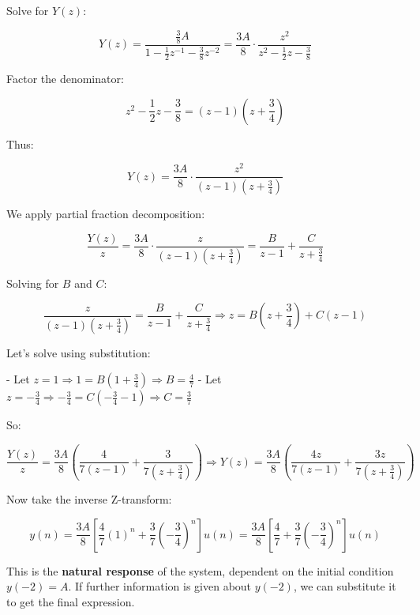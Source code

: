 \documentclass[12pt]{article}
\begin{document}
    Solve for \( Y(z) \):
    
    \[
    Y(z) = \frac{\frac{3}{8}A}{1 - \frac{1}{2}z^{-1} - \frac{3}{8}z^{-2}} = \frac{3A}{8} \cdot \frac{z^2}{z^2 - \frac{1}{2}z - \frac{3}{8}}
    \]
    
    Factor the denominator:
    
    \[
    z^2 - \frac{1}{2}z - \frac{3}{8} = \left(z - 1\right)\left(z + \frac{3}{4}\right)
    \]
    
    Thus:
    
    \[
    Y(z) = \frac{3A}{8} \cdot \frac{z^2}{(z - 1)(z + \frac{3}{4})}
    \]
    
    We apply partial fraction decomposition:
    
    \[
    \frac{Y(z)}{z} = \frac{3A}{8} \cdot \frac{z}{(z - 1)(z + \frac{3}{4})} = \frac{B}{z - 1} + \frac{C}{z + \frac{3}{4}}
    \]
    
    Solving for \( B \) and \( C \):
    
    \[
    \frac{z}{(z - 1)(z + \frac{3}{4})} = \frac{B}{z - 1} + \frac{C}{z + \frac{3}{4}}
    \Rightarrow z = B\left(z + \frac{3}{4}\right) + C\left(z - 1\right)
    \]
    
    Let’s solve using substitution:
    
    - Let \( z = 1 \Rightarrow 1 = B\left(1 + \frac{3}{4}\right) \Rightarrow B = \frac{4}{7} \)
    - Let \( z = -\frac{3}{4} \Rightarrow -\frac{3}{4} = C\left(-\frac{3}{4} - 1\right) \Rightarrow C = \frac{3}{7} \)
    
    So:
    
    \[
    \frac{Y(z)}{z} = \frac{3A}{8} \left( \frac{4}{7(z - 1)} + \frac{3}{7(z + \frac{3}{4})} \right)
    \Rightarrow Y(z) = \frac{3A}{8} \left( \frac{4z}{7(z - 1)} + \frac{3z}{7(z + \frac{3}{4})} \right)
    \]
    
    Now take the inverse Z-transform:
    
    \[
    y(n) = \frac{3A}{8} \left[ \frac{4}{7}(1)^n + \frac{3}{7}\left(-\frac{3}{4}\right)^n \right] u(n)
    = \frac{3A}{8} \left[ \frac{4}{7} + \frac{3}{7}\left(-\frac{3}{4}\right)^n \right] u(n)
    \]
    
    \bigskip
    
    \noindent This is the \textbf{natural response} of the system, dependent on the initial condition \( y(-2) = A \). If further information is given about \( y(-2) \), we can substitute it to get the final expression.
   	

    
\end{document}
